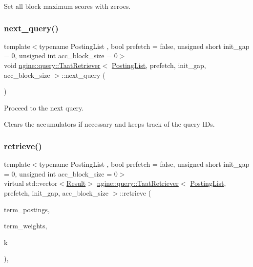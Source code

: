 Set all block maximum scores with zeroes. 

\mbox{\label{classngine_1_1query_1_1TaatRetriever_aa8821cfb9b805f6f40541d21451d96e9}} 
\subsubsection{\texorpdfstring{next\+\_\+query()}{next\_query()}}
{\footnotesize\ttfamily template$<$typename Posting\+List , bool prefetch = false, unsigned short init\+\_\+gap = 0, unsigned int acc\+\_\+block\+\_\+size = 0$>$ \\
void \hyperlink{classngine_1_1query_1_1TaatRetriever}{ngine\+::query\+::\+Taat\+Retriever}$<$ \hyperlink{classngine_1_1PostingList}{Posting\+List}, prefetch, init\+\_\+gap, acc\+\_\+block\+\_\+size $>$\+::next\+\_\+query (\begin{DoxyParamCaption}{ }\end{DoxyParamCaption})\hspace{0.3cm}{\ttfamily [inline]}}

Proceed to the next query.

Clears the accumulators if necessary and keeps track of the query I\+Ds. \mbox{\label{classngine_1_1query_1_1TaatRetriever_a81d0ee715edbd1a105476e4bb7e7273d}} 
\subsubsection{\texorpdfstring{retrieve()}{retrieve()}}
{\footnotesize\ttfamily template$<$typename Posting\+List , bool prefetch = false, unsigned short init\+\_\+gap = 0, unsigned int acc\+\_\+block\+\_\+size = 0$>$ \\
virtual std\+::vector$<$\hyperlink{structngine_1_1query_1_1Result}{Result}$>$ \hyperlink{classngine_1_1query_1_1TaatRetriever}{ngine\+::query\+::\+Taat\+Retriever}$<$ \hyperlink{classngine_1_1PostingList}{Posting\+List}, prefetch, init\+\_\+gap, acc\+\_\+block\+\_\+size $>$\+::retrieve (\begin{DoxyParamCaption}\item[{const std\+::vector$<$ \hyperlink{classngine_1_1PostingList}{Posting\+List} $>$ \&}]{term\+\_\+postings,  }\item[{const std\+::vector$<$ \hyperlink{structngine_1_1Score}{Score} $>$ \&}]{term\+\_\+weights,  }\item[{std\+::size\+\_\+t}]{k }\end{DoxyParamCaption})\hspace{0.3cm}{\ttfamily [inline]}, {\ttfamily [virtual]}}



